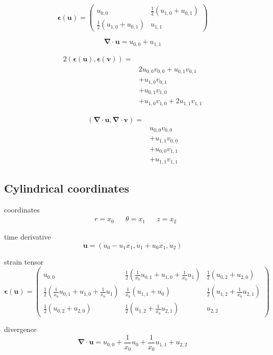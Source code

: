 \documentclass{scrartcl}
\newcommand{\vect}[1]{\boldsymbol{#1}}
\newcommand{\ten}[1]{\boldsymbol{#1}}
\begin{document}
\[
\ten{\epsilon}(\vect{u}) =
\begin{pmatrix}
u_{0,0} & \frac{1}{2}(u_{1,0} + u_{0,1}) \\
\frac{1}{2}(u_{1,0} + u_{0,1}) & u_{1,1}
\end{pmatrix}
\]

\[
\vect{\nabla} \cdot \vect{u} = u_{0,0} + u_{1,1}
\]

\begin{align*}
2(\ten{\epsilon}(\vect{u}), \ten{\epsilon}(\vect{v})) =& \\
&2 u_{0,0} v_{0,0} + u_{0,1} v_{0,1} \\
&+ u_{1,0} v_{0,1} \\
&+ u_{0,1} v_{1,0} \\
&+ u_{1,0} v_{1,0} + 2 u_{1,1} v_{1,1}
\end{align*}

\begin{align*}
(\vect{\nabla} \cdot \vect{u}, \vect{\nabla} \cdot \vect{v}) =& \\
& u_{0,0} v_{0,0} \\
&+ u_{1,1} v_{0,0} \\
&+ u_{0,0} v_{1,1} \\
&+ u_{1,1} v_{1,1}
\end{align*}

\subsection{Cylindrical coordinates}

coordinates
\begin{align*}
&r = x_0 & &\theta = x_1 & &z = x_2
\end{align*}

time derivative
\[
\dot{\vect{u}} = ( \dot{u}_0 - u_1 \dot{x}_1, \dot{u}_1 
+ u_0 \dot{x}_1, \dot{u}_2 )
\]

strain tensor
\[
\ten{\epsilon}(\vect{u}) = 
\begin{pmatrix}
u_{0,0} & \frac{1}{2}(\frac{1}{x_0}u_{0,1} + u_{1,0} + \frac{1}{x_0}u_1) &
\frac{1}{2}(u_{0,2} + u_{2,0}) \\
\frac{1}{2}(\frac{1}{x_0}u_{0,1} + u_{1,0} + \frac{1}{x_0}u_1) &
\frac{1}{x_0}(u_{1,1} + u_0) & \frac{1}{2}(u_{1,2} + \frac{1}{x_0}u_{2,1}) \\
\frac{1}{2}(u_{0,2} + u_{2,0}) & \frac{1}{2}(u_{1,2} + \frac{1}{x_0}u_{2,1}) &
u_{2,2} 
\end{pmatrix}
\]

divergence
\[
\vect{\nabla} \cdot \vect{u} = u_{0,0} + \frac{1}{x_0}u_0 + \frac{1}{x_0}u_{1,1}
+ u_{2,2}
\]
\end{document}
